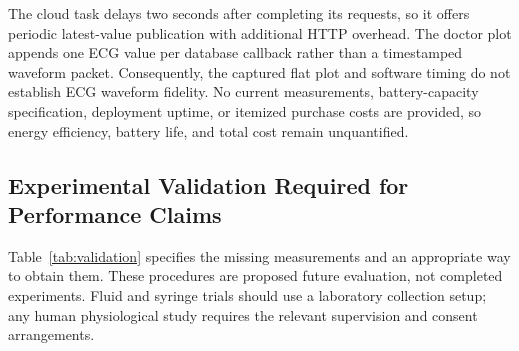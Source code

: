 The cloud task delays two seconds after completing its requests, so it offers periodic latest-value publication with additional HTTP overhead. The doctor plot appends one ECG value per database callback rather than a timestamped waveform packet. Consequently, the captured flat plot and software timing do not establish ECG waveform fidelity. No current measurements, battery-capacity specification, deployment uptime, or itemized purchase costs are provided, so energy efficiency, battery life, and total cost remain unquantified.

\subsection{Experimental Validation Required for Performance Claims}
Table~\ref{tab:validation} specifies the missing measurements and an appropriate way to obtain them. These procedures are proposed future evaluation, not completed experiments. Fluid and syringe trials should use a laboratory collection setup; any human physiological study requires the relevant supervision and consent arrangements.

